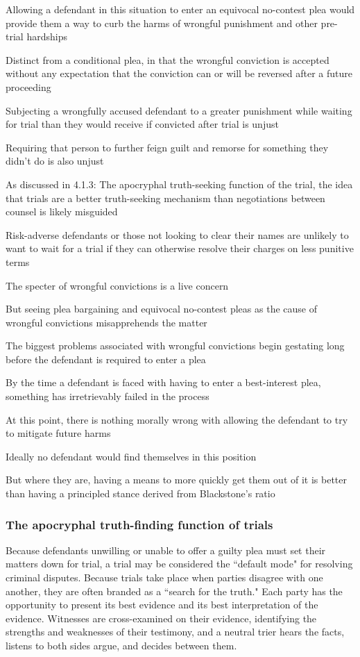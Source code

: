 Allowing a defendant in this situation to enter an equivocal no-contest plea would provide them a way to curb the harms of wrongful punishment and other pre-trial hardships

Distinct from a conditional plea, in that the wrongful conviction is accepted without any expectation that the conviction can or will be reversed after a future proceeding

Subjecting a wrongfully accused defendant to a greater punishment while waiting for trial than they would receive if convicted after trial is unjust

Requiring that person to further feign guilt and remorse for something they didn't do is also unjust

As discussed in 4.1.3: The apocryphal truth-seeking function of the trial, the idea that trials are a better truth-seeking mechanism than negotiations between counsel is likely misguided

Risk-adverse defendants or those not looking to clear their names are unlikely to want to wait for a trial if they can otherwise resolve their charges on less punitive terms

The specter of wrongful convictions is a live concern

But seeing plea bargaining and equivocal no-contest pleas as the cause of wrongful convictions misapprehends the matter

The biggest problems associated with wrongful convictions begin gestating long before the defendant is required to enter a plea

By the time a defendant is faced with having to enter a best-interest plea, something has irretrievably failed in the process

At this point, there is nothing morally wrong with allowing the defendant to try to mitigate future harms

Ideally no defendant would find themselves in this position

But where they are, having a means to more quickly get them out of it is better than having a principled stance derived from Blackstone's ratio

\subsubsection{The apocryphal truth-finding function of trials}

Because defendants unwilling or unable to offer a guilty plea must set their matters down for trial, a trial may be considered the ``default mode" for resolving criminal disputes. Because trials take place when parties disagree with one another, they are often branded as a ``search for the truth." Each party has the opportunity to present its best evidence and its best interpretation of the evidence. Witnesses are cross-examined on their evidence, identifying the strengths and weaknesses of their testimony, and a neutral trier hears the facts, listens to both sides argue, and decides between them.

